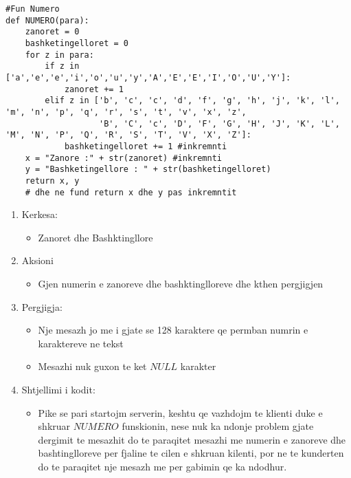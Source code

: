 \documentclass[]{article}
\begin{document}
\begin{lstlisting}
#Fun Numero
def NUMERO(para):
    zanoret = 0
    bashketingelloret = 0
    for z in para:
        if z in ['a','e','e','i','o','u','y','A','E','E','I','O','U','Y']:
            zanoret += 1
        elif z in ['b', 'c', 'c', 'd', 'f', 'g', 'h', 'j', 'k', 'l', 'm', 'n', 'p', 'q', 'r', 's', 't', 'v', 'x', 'z',
                   'B', 'C', 'c', 'D', 'F', 'G', 'H', 'J', 'K', 'L', 'M', 'N', 'P', 'Q', 'R', 'S', 'T', 'V', 'X', 'Z']:
            bashketingelloret += 1 #inkremnti
    x = "Zanore :" + str(zanoret) #inkremnti
    y = "Bashketingellore : " + str(bashketingelloret)
    return x, y
    # dhe ne fund return x dhe y pas inkremntit

\end{lstlisting}
\begin{enumerate}
\item Kerkesa:
\begin{itemize}
\item Zanoret dhe Bashktingllore
\end{itemize}
\item Aksioni
\begin{itemize}
\item Gjen numerin e zanoreve dhe bashktinglloreve dhe kthen pergjigjen
\end{itemize}
\item Pergjigja:
\begin{itemize}
\item Nje mesazh jo me i gjate se 128 karaktere qe permban numrin e karaktereve ne tekst
\item Mesazhi nuk guxon te ket $NULL$ karakter
\end{itemize}
\item Shtjellimi i kodit:
\begin{itemize}
\item Pike se pari startojm serverin, keshtu qe vazhdojm te klienti duke e  shkruar $NUMERO$ funskionin, nese nuk ka ndonje problem gjate dergimit te mesazhit do te paraqitet mesazhi me numerin e zanoreve dhe bashtinglloreve per  fjaline te cilen e shkruan kilenti, por ne te kunderten do te paraqitet nje mesazh me per gabimin qe ka ndodhur.
\end{itemize}
\end{enumerate}
\newpage
\end{document}
